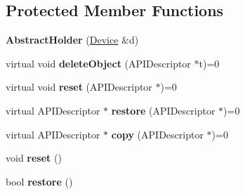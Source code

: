 \subsection*{Protected Member Functions}
\begin{DoxyCompactItemize}
\item 
\hypertarget{class_tempest_1_1_abstract_holder_a18450dd3cbbee590b7ce3bf8ab554693}{{\bfseries Abstract\+Holder} (\hyperlink{class_tempest_1_1_device}{Device} \&d)}\label{class_tempest_1_1_abstract_holder_a18450dd3cbbee590b7ce3bf8ab554693}

\item 
\hypertarget{class_tempest_1_1_abstract_holder_ac2d68f34e248226f688b4c96a479c332}{virtual void {\bfseries delete\+Object} (A\+P\+I\+Descriptor $\ast$t)=0}\label{class_tempest_1_1_abstract_holder_ac2d68f34e248226f688b4c96a479c332}

\item 
\hypertarget{class_tempest_1_1_abstract_holder_aec2c61461b9097cd6d056a7444ecbbc4}{virtual void {\bfseries reset} (A\+P\+I\+Descriptor $\ast$)=0}\label{class_tempest_1_1_abstract_holder_aec2c61461b9097cd6d056a7444ecbbc4}

\item 
\hypertarget{class_tempest_1_1_abstract_holder_a2980538d3d1969f90b03ecd97f319927}{virtual A\+P\+I\+Descriptor $\ast$ {\bfseries restore} (A\+P\+I\+Descriptor $\ast$)=0}\label{class_tempest_1_1_abstract_holder_a2980538d3d1969f90b03ecd97f319927}

\item 
\hypertarget{class_tempest_1_1_abstract_holder_ad62a1b7d1a3edbea11e08915c7326f84}{virtual A\+P\+I\+Descriptor $\ast$ {\bfseries copy} (A\+P\+I\+Descriptor $\ast$)=0}\label{class_tempest_1_1_abstract_holder_ad62a1b7d1a3edbea11e08915c7326f84}

\item 
\hypertarget{class_tempest_1_1_abstract_holder_a2a3c710af556996e79e7a3cffdd130df}{void {\bfseries reset} ()}\label{class_tempest_1_1_abstract_holder_a2a3c710af556996e79e7a3cffdd130df}

\item 
\hypertarget{class_tempest_1_1_abstract_holder_a0a2337fbe431a8e66a03cefbb32cb14f}{bool {\bfseries restore} ()}\label{class_tempest_1_1_abstract_holder_a0a2337fbe431a8e66a03cefbb32cb14f}

\end{DoxyCompactItemize}
